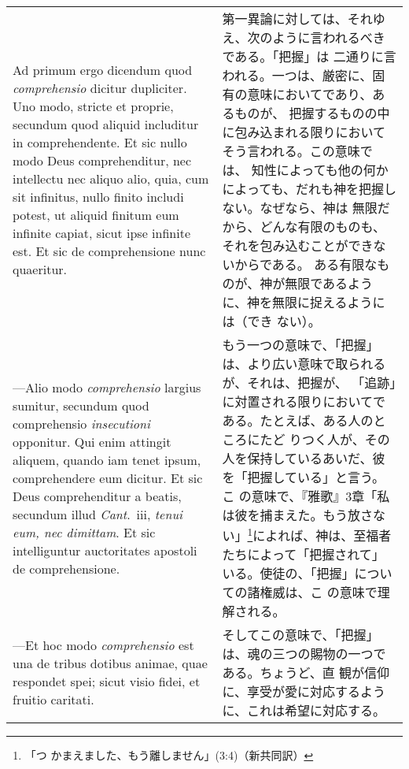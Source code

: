\documentclass[10pt]{jsarticle} %
\begin{document}
\begin{longtable}{p{21em}p{21em}}
\\


{\sc Ad primum ergo dicendum} quod {\it comprehensio} dicitur
dupliciter. Uno modo, stricte et proprie, secundum quod aliquid
includitur in comprehendente. Et sic nullo modo Deus comprehenditur,
nec intellectu nec aliquo alio, quia, cum sit infinitus, nullo finito
includi potest, ut aliquid finitum eum infinite capiat, sicut ipse
infinite est. Et sic de comprehensione nunc quaeritur.

&

第一異論に対しては、それゆえ、次のように言われるべきである。「把握」は
二通りに言われる。一つは、厳密に、固有の意味においてであり、あるものが、
把握するものの中に包み込まれる限りにおいてそう言われる。この意味では、
知性によっても他の何かによっても、だれも神を把握しない。なぜなら、神は
無限だから、どんな有限のものも、それを包み込むことができないからである。
ある有限なものが、神が無限であるように、神を無限に捉えるようには（でき
ない）。

\\



---Alio modo {\it comprehensio} largius sumitur, secundum quod
comprehensio {\it insecutioni} opponitur. Qui enim attingit aliquem,
quando iam tenet ipsum, comprehendere eum dicitur. Et sic Deus
comprehenditur a beatis, secundum illud {\it Cant}.\ {\sc iii}, {\it
tenui eum, nec dimittam}. Et sic intelliguntur auctoritates apostoli
de comprehensione.

&

もう一つの意味で、「把握」は、より広い意味で取られるが、それは、把握が、
「追跡」に対置される限りにおいてである。たとえば、ある人のところにたど
りつく人が、その人を保持しているあいだ、彼を「把握している」と言う。こ
の意味で、『雅歌』3章「私は彼を捕まえた。もう放さない」\footnote{「つ
かまえました、もう離しません」(3:4)（新共同訳）}によれば、神は、至福者
たちによって「把握されて」いる。使徒の、「把握」についての諸権威は、こ
の意味で理解される。


\\

---Et hoc modo {\it comprehensio} est una de tribus dotibus animae,
quae respondet spei; sicut visio fidei, et fruitio caritati.

&

そしてこの意味で、「把握」は、魂の三つの賜物の一つである。ちょうど、直
観が信仰に、享受が愛に対応するように、これは希望に対応する。

\\


\end{longtable}
\end{document}
